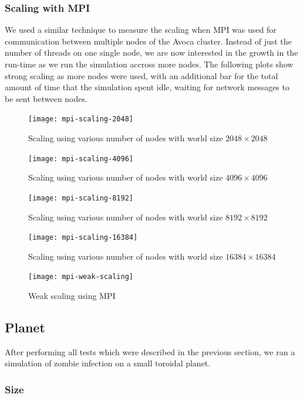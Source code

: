 \documentclass[a4paper]{article}
\begin{document}
\subsubsection{Scaling with MPI}

We used a similar technique to measure the scaling when MPI was used for communication between multiple nodes of the Avoca cluster.
Instead of just the number of threads on one single node, we are now interested in the growth in the run-time as we run the simulation accross more nodes.
The following plots show strong scaling as more nodes were used, with an additional bar for the total amount of time that the simulation spent idle, waiting for network messages to be sent between nodes.

\begin{figure}
    \centering
    \texttt{[image: mpi-scaling-2048]}
    \caption{Scaling using various number of nodes with world size $2048 \times 2048$}
\end{figure}

\begin{figure}
    \centering
    \texttt{[image: mpi-scaling-4096]}
    \caption{Scaling using various number of nodes with world size $4096 \times 4096$}
\end{figure}

\begin{figure}
    \centering
    \texttt{[image: mpi-scaling-8192]}
    \caption{Scaling using various number of nodes with world size $8192 \times 8192$}
\end{figure}

\begin{figure}
    \centering
    \texttt{[image: mpi-scaling-16384]}
    \caption{Scaling using various number of nodes with world size $16384 \times 16384$}
\end{figure}


\begin{figure}
    \centering
    \texttt{[image: mpi-weak-scaling]}
    \caption{Weak scaling using MPI}
\end{figure}

\subsection{Planet}

After performing all tests which were described in the previous section, we ran a simulation of zombie infection on a small toroidal planet.

\subsubsection{Size}
\end{document}
